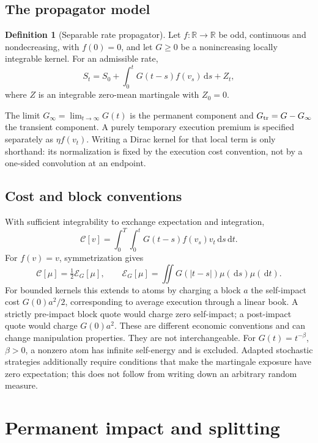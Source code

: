 \documentclass[11pt]{article}
\numberwithin{equation}{section}
\theoremstyle{definition}
\newtheorem{definition}[theorem]{Definition}
\theoremstyle{remark}
\newcommand{\R}{\mathbb{R}}
\theoremstyle{definition}
\newcommand{\dd}{\,\mathrm d}
\begin{document}
\subsection{The propagator model}
\begin{definition}[Separable rate propagator]\label{def:model}
Let $f:\R\to\R$ be odd, continuous and nondecreasing, with $f(0)=0$, and let
$G\geq0$ be a nonincreasing locally integrable kernel. For an admissible rate,
\begin{equation}\label{eq:price}
 S_t=S_0+\int_0^tG(t-s)f(v_s)\dd s+Z_t,
\end{equation}
where $Z$ is an integrable zero-mean martingale with $Z_0=0$.
\end{definition}
The limit $G_\infty=\lim_{t\to\infty}G(t)$ is the permanent component and
$G_{\rm tr}=G-G_\infty$ the transient component. A purely temporary execution
premium is specified separately as $\eta f(v_t)$. Writing a Dirac kernel for
that local term is only shorthand: its normalization is fixed by the execution
cost convention, not by a one-sided convolution at an endpoint.

\subsection{Cost and block conventions}
With sufficient integrability to exchange expectation and integration,
\begin{equation}\label{eq:cost}
 \mathcal C[v]=\int_0^T\int_0^t G(t-s)f(v_s)v_t\dd s\dd t.
\end{equation}
For $f(v)=v$, symmetrization gives
\begin{equation}\label{eq:energy}
 \mathcal C[\mu]=\tfrac12\mathcal E_G[\mu],\qquad
 \mathcal E_G[\mu]=\iint G(|t-s|)\mu(\dd s)\mu(\dd t).
\end{equation}
For bounded kernels this extends to atoms by charging a block $a$ the
self-impact cost $G(0)a^2/2$, corresponding to average execution through a
linear book. A strictly pre-impact block quote would charge zero self-impact;
a post-impact quote would charge $G(0)a^2$. These are different economic
conventions and can change manipulation properties. They are not interchangeable.
For $G(t)=t^{-\beta}$, $\beta>0$, a nonzero atom has infinite self-energy and is
excluded. Adapted stochastic strategies additionally require conditions that
make the martingale exposure have zero expectation; this does not follow from
writing down an arbitrary random measure.

\section{Permanent impact and splitting}\label{sec:perm}
\end{document}
